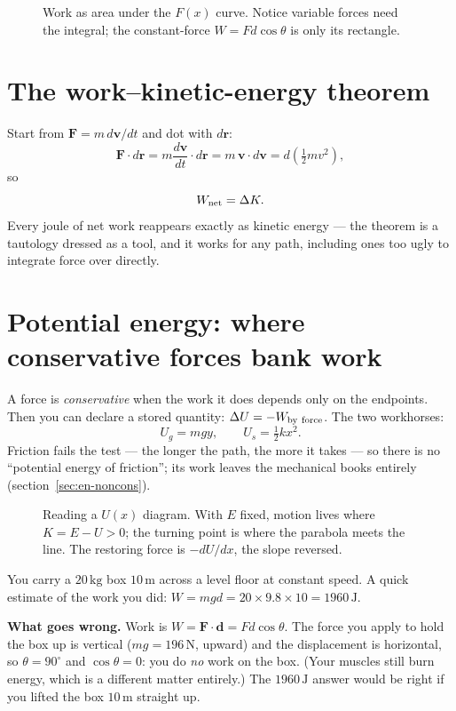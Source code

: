 \begin{figure}[htbp]\centering

\caption{Work as area under the $F(x)$ curve. Notice variable forces need
the integral; the constant-force $W=Fd\cos\theta$ is only its rectangle.}
\label{fig:work}
\end{figure}

\section{The work--kinetic-energy theorem}\label{sec:en-wke}

Start from $\mathbf F=m\,d\mathbf v/dt$ and dot with $d\mathbf r$:
\[
  \mathbf F\cdot d\mathbf r
   =m\frac{d\mathbf v}{dt}\cdot d\mathbf r
   =m\,\mathbf v\cdot d\mathbf v
   =d\!\left(\tfrac12mv^{2}\right),
\]
so
\begin{equation}
  W_{\rm net}=\Delta K.\label{eq:wke}
\end{equation}
Every joule of net work reappears exactly as kinetic energy --- the
theorem is a tautology dressed as a tool, and it works for any path,
including ones too ugly to integrate force over directly.

\section{Potential energy: where conservative forces bank work}\label{sec:en-pe}

A force is \emph{conservative} when the work it does depends only on the
endpoints. Then you can declare a stored quantity:
$\Delta U=-W_{\rm by\ force}$. The two workhorses:
\[
  U_g=mgy,\qquad U_s=\tfrac12kx^{2}.
\]
Friction fails the test --- the longer the path, the more it takes --- so
there is no ``potential energy of friction''; its work leaves the
mechanical books entirely (section~\ref{sec:en-noncons}).

\begin{figure}[htbp]\centering

\caption{Reading a $U(x)$ diagram. With $E$ fixed, motion lives where
$K=E-U>0$; the turning point is where the parabola meets the line. The
restoring force is $-dU/dx$, the slope reversed.}
\label{fig:ux}
\end{figure}

\begin{example}\label{ex:naive-carry}
You carry a $20\,\mathrm{kg}$ box $10\,\mathrm{m}$ across a level floor at constant speed. A quick estimate of the work you
did: $W=mgd=20\times9.8\times10=1960\,\mathrm{J}$.
\par\smallskip
\textbf{What goes wrong.} Work is $W=\mathbf F\cdot\mathbf d=Fd\cos\theta$. The force you apply to hold the box up is
vertical ($mg=196\,\mathrm{N}$, upward) and the displacement is horizontal, so $\theta=90^\circ$ and
$\cos\theta=0$: you do \emph{no} work on the box. (Your muscles still burn energy, which is a different matter
entirely.) The $1960\,\mathrm{J}$ answer would be right if you lifted the box $10\,\mathrm{m}$ straight up.
\end{example}

